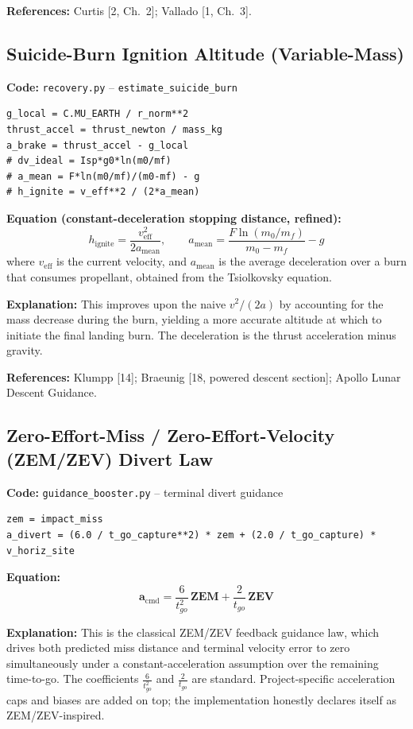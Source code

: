\documentclass[12pt,a4paper]{article}
\begin{document}
\textbf{References:} Curtis [2, Ch.~2]; Vallado [1, Ch.~3].

\subsection{Suicide-Burn Ignition Altitude (Variable-Mass)}

\textbf{Code:} \texttt{recovery.py} – \texttt{estimate\_suicide\_burn}
\begin{verbatim}
g_local = C.MU_EARTH / r_norm**2
thrust_accel = thrust_newton / mass_kg
a_brake = thrust_accel - g_local
# dv_ideal = Isp*g0*ln(m0/mf)
# a_mean = F*ln(m0/mf)/(m0-mf) - g
# h_ignite = v_eff**2 / (2*a_mean)
\end{verbatim}

\textbf{Equation (constant-deceleration stopping distance, refined):}
\[
h_{\text{ignite}} = \frac{v_{\text{eff}}^2}{2 a_{\text{mean}}},\qquad
a_{\text{mean}} = \frac{F\ln(m_0/m_f)}{m_0 - m_f} - g
\]
where $v_{\text{eff}}$ is the current velocity, and $a_{\text{mean}}$ is the average deceleration over a burn that consumes propellant, obtained from the Tsiolkovsky equation.

\textbf{Explanation:} This improves upon the naive $v^2/(2a)$ by accounting for the mass decrease during the burn, yielding a more accurate altitude at which to initiate the final landing burn. The deceleration is the thrust acceleration minus gravity.

\textbf{References:} Klumpp [14]; Braeunig [18, powered descent section]; Apollo Lunar Descent Guidance.

\subsection{Zero-Effort-Miss / Zero-Effort-Velocity (ZEM/ZEV) Divert Law}

\textbf{Code:} \texttt{guidance\_booster.py} – terminal divert guidance
\begin{verbatim}
zem = impact_miss
a_divert = (6.0 / t_go_capture**2) * zem + (2.0 / t_go_capture) * v_horiz_site
\end{verbatim}

\textbf{Equation:}
\[
\mathbf{a}_{\text{cmd}} = \frac{6}{t_{go}^2}\,\mathbf{ZEM} + \frac{2}{t_{go}}\,\mathbf{ZEV}
\]

\textbf{Explanation:} This is the classical ZEM/ZEV feedback guidance law, which drives both predicted miss distance and terminal velocity error to zero simultaneously under a constant-acceleration assumption over the remaining time-to-go. The coefficients $\frac{6}{t_{go}^2}$ and $\frac{2}{t_{go}}$ are standard. Project-specific acceleration caps and biases are added on top; the implementation honestly declares itself as ZEM/ZEV-inspired.
\end{document}
